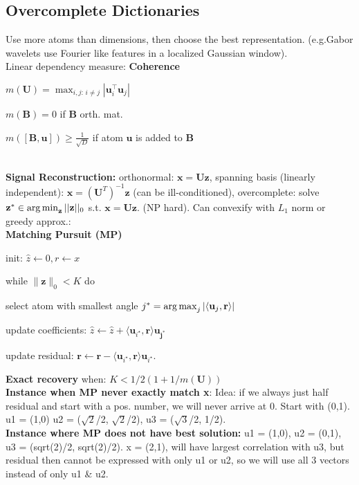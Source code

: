\subsection*{Overcomplete Dictionaries}
Use more atoms than dimensions, then choose the best representation. (e.g.Gabor wavelets use Fourier like features in a localized Gaussian window). \\ Linear dependency measure:  \textbf{Coherence}\\
\begin{inparaitem}[\color{gray}\textbullet]
	\item $m(\mathbf{U}) = \max_{i,j:\, i \neq j} | \mathbf{u}_i^\top \mathbf{u}_j |$
	\item $m(\mathbf{B}) = 0$ if $\mathbf{B}$ orth. mat.
	\item $m([\mathbf{B}, \mathbf{u}]) \geq \frac{1}{\sqrt{D}}$ if atom $\mathbf{u}$ is added to $\mathbf{B}$
\end{inparaitem}\\
\textbf{Signal Reconstruction:} orthonormal: $\mathbf{x} = \mathbf{Uz}$, spanning basis (linearly independent): $\mathbf{x} = (\mathbf{U}^T)^{-1}\mathbf{z}$ (can be ill-conditioned), overcomplete: solve $\mathbf{z}^* \in \operatorname*{arg\,min}_\mathbf{z} ||\mathbf{z}||_0$ s.t. $\mathbf{x}=\mathbf{Uz}$. (NP hard). Can convexify with $L_1$ norm or greedy approx.: \\
\textbf{Matching Pursuit (MP)}
\begin{inparaenum}
	\item init: $\hat z \leftarrow 0, r \leftarrow x$
	\item while $\|\mathbf{z}\|_0 < K$ do
	\item select atom with smallest angle $j^* = \operatorname*{arg\,max}_j |\langle \mathbf{u}_j, \mathbf{r} \rangle|$
	\item update coefficients: $\hat z\leftarrow \hat z + \langle \mathbf{u}_{i^\star}, \mathbf{r} \rangle \mathbf{u_{j^*}}$
	\item update residual: $\mathbf{r} \leftarrow \mathbf{r} - \langle \mathbf{u}_{i^\star}, \mathbf{r} \rangle \mathbf{u}_{i^\star}$.
\end{inparaenum}
\textbf{Exact recovery} when: $K<1/2( 1+1/m(\mathbf{U}))$ \\
\textbf{Instance when MP never exactly match x}: Idea: if we always just half residual and start with a pos. number, we will never arrive at $0$. Start with (0,1). u1 = (1,0) u2 = ($\sqrt 2$/2, $\sqrt 2$/2), u3 = ($\sqrt 3$/2, 1/2). \\
\textbf{Instance where MP does not have best solution:} u1 = (1,0), u2 = (0,1), u3 = (sqrt(2)/2, sqrt(2)/2). x = (2,1), will have largest correlation with u3, but residual then cannot be expressed with only u1 or u2, so we will use all 3 vectors instead of only u1 \& u2.
